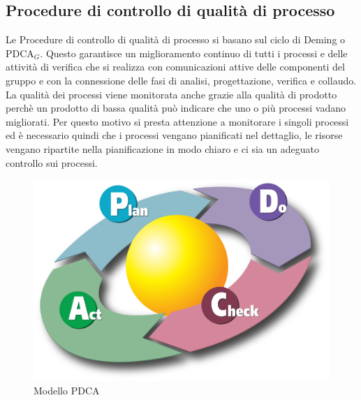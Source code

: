 \subsection{Procedure di controllo di qualità di processo}
Le Procedure di controllo di qualità di processo si basano sul ciclo di Deming o PDCA$_G$. Questo garantisce un miglioramento continuo di tutti i processi e delle attività di verifica che si realizza con comunicazioni attive delle componenti del gruppo e con la connessione delle fasi di analisi, progettazione, verifica e collaudo. La qualità dei processi viene monitorata anche grazie alla qualità di prodotto perchè un prodotto di bassa qualità può indicare che uno o più processi vadano migliorati. Per questo motivo si presta attenzione a monitorare i singoli processi ed è necessario quindi che i processi vengano pianificati nel dettaglio, le risorse vengano ripartite nella pianificazione in modo chiaro e ci sia un adeguato controllo sui processi.
\begin{figure}[h!]
		\centering
		\includegraphics[scale=.2]{img/2000px-PDCA_Cycle.png}
		\caption{Modello PDCA}
		\label{fig:ModelloSpy}
\end{figure}